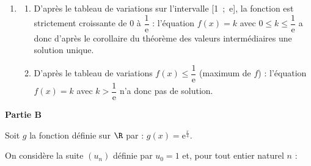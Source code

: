\begin{enumerate}
\begin{enumerate}
		\item $f(1)=0$ et $f(\text e) = \dfrac{1}{\text e}$; on dresse le tableau de variations  de la fonction $f$ sur $[1~;~+\infty[$.

\begin{center}
{\renewcommand{\arraystretch}{1.1}
\def\esp{\hspace*{2.5cm}}
\def\hauteur{0pt}
$\begin{array}{|c|*5{c}|}
\hline
x & 1  & \esp & \text e & \esp & +\infty \\ 
\hline
f'(x) &  &   \pmb{+} & \vline\hspace{-2.7pt}0 & \pmb{-} & \\ 
\hline
 & &  &   \Rnode{max}{\frac{1}{\text e}}  &  &   \\  
f(x) & &     &  &  &  \rule{0pt}{\hauteur} \\ 
 & \Rnode{min1}{0} &   &  &  &   \Rnode{min2}{0} \rule{0pt}{\hauteur}    
 \ncline{->}{min1}{max} 
 \ncline{->}{max}{min2} 
 \\ 
\hline
\end{array} $
}
\end{center}	

	\end{enumerate}
\item 
	\begin{enumerate}
		\item 
D'après le tableau de variations sur l'intervalle [1~;~e], la fonction est strictement croissante de $0$ à $\dfrac{1}{\text{e}}$ : l'équation $f(x) = k$ avec $0 \leqslant k \leqslant \dfrac{1}{\text{e}}$ a donc d'après le corollaire du théorème des valeurs intermédiaires une solution unique.

		\item 


D'après le tableau de variations $f(x) \leqslant \dfrac{1}{\text{e}}$ (maximum de $f$) : l'équation $f(x) = k$ avec $k > \dfrac{1}{\text{e}}$ n'a donc pas de solution.
	\end{enumerate}
\end{enumerate}

\bigskip

\textbf{Partie B}

\medskip

Soit $g$ la fonction définie sur $\R$ par : 
$g(x) = \text{e}^{\frac{x}{4}}.$

On considère la suite $\left(u_n\right)$ définie par $u_0 = 1$ et, pour tout entier naturel $n$ :

